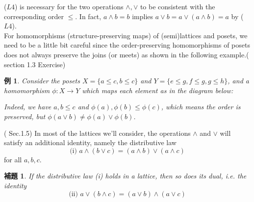 \documentclass[a4j,12pt]{jarticle}
\numberwithin{equation}{section}
\newtheorem{example}{例}[section]
\newtheorem{lemma}[thm]{補題}
\begin{document}
($L4$) is necessary for the two operations $\wedge, \vee$ to be consistent with the corresponding order $\le$.
In fact, $a\wedge b = b$ implies $a \vee b = a \vee ( a \wedge b) = a$ by ($L4$).\\
For homomorphisms (structure-preserving maps) of (semi)lattices and posets, we need to be a little bit careful since the order-preserving homomorphisms of posets does not always preserve the joins (or meets) as shown in the following example.(\cite{Stone} section 1.3 Exercise)
\begin{example}
  Consider the posets $X=\{a \le c, b \le c\}$ and $Y=\{e \le g, f \le g, g \le h\}$, and a homomorphism $\phi : X \rightarrow Y$ which maps each element as in the diagram below:
\begin{figure}[H]
\end{figure}  
Indeed, we have $a, b\le c$ and $\phi(a), \phi(b) \le \phi(c)$, which means the order is preserved, but $\phi(a \vee b) \ne \phi(a) \vee \phi(b)$.
\end{example}
(\cite{Stone} Sec.1.5) In most of the lattices we'll consider, the operations $\wedge$ and $\vee$ will satisfy an additional identity, namely the distributive law
\begin{equation}
  \label{eq:distributivity}
  \text{(i) } a \wedge (b \vee c) = (a \wedge b) \vee (a \wedge c)
\end{equation}
for all $a,b,c$.
\begin{lemma}
  If the distributive law (i) holds in a lattice, then so does its dual, i.e. the identity
  \begin{equation}
    \label{eq:ditributivity2}
    \text{(ii) } a \vee (b \wedge c) = (a \vee b) \wedge (a \vee c)
  \end{equation}
\end{lemma}
\end{document}
